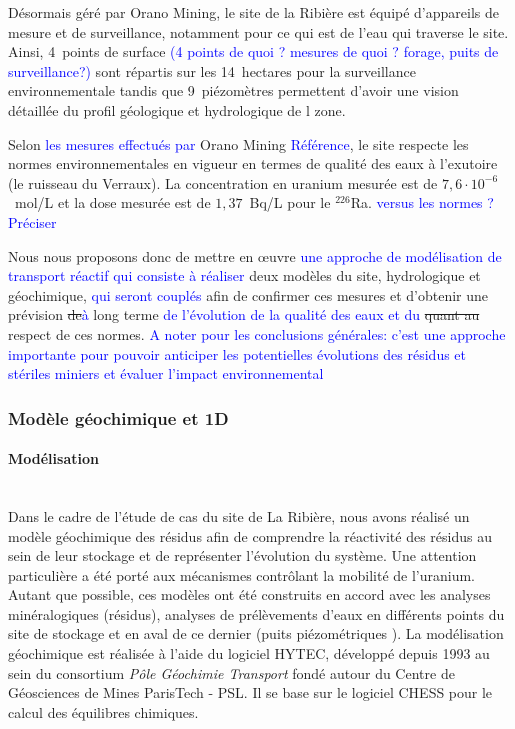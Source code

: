 \documentclass{article}
\newcommand{\blue}[1]{\textcolor{blue}{#1}} %
\begin{document}
Désormais géré par Orano Mining, le site de la Ribière est équipé d'appareils de mesure et de surveillance, notamment pour ce qui est de l’eau qui traverse le site. Ainsi, 4~points de surface \blue{(4 points de quoi ? mesures de quoi ? forage, puits de surveillance?)} sont répartis sur les 14~hectares pour la surveillance environnementale tandis que 9~piézomètres permettent d’avoir une vision détaillée du profil géologique et hydrologique de l zone.

Selon \blue{les mesures effectués par} Orano Mining \blue{Référence}, le site respecte les normes environnementales en vigueur en termes de qualité des eaux à l’exutoire (le ruisseau du Verraux). La concentration en uranium mesurée est de $7,6 \cdot 10^{-6}$~mol/L et la dose mesurée est de $1,37$~Bq/L pour le $^{226}$Ra. \blue{versus les normes ? Préciser} %

Nous nous proposons donc de mettre en œuvre \blue{une approche de modélisation de transport réactif qui consiste à réaliser} deux modèles du site, hydrologique et géochimique, \blue{qui seront couplés}  afin de confirmer ces mesures et d’obtenir une prévision \sout{de}\blue{à} long terme \blue{de l'évolution de la qualité des eaux et du} \sout{quant au} respect de ces normes. \blue{A noter pour les conclusions générales: c'est une approche importante pour pouvoir anticiper les potentielles évolutions des résidus et stériles miniers et évaluer l'impact environnemental}

\subsubsection{Modèle géochimique et 1D} \label{subsec:geoch_1D}

\paragraph{Modélisation \\ \\}
Dans le cadre de l’étude de cas du site de La Ribière, nous avons réalisé un modèle géochimique des résidus afin de comprendre la réactivité des résidus au sein de leur stockage et de représenter l'évolution du système. Une attention particulière a été porté aux mécanismes contrôlant la mobilité de l'uranium. Autant que possible, ces modèles ont été construits en accord avec les analyses minéralogiques (résidus), analyses de prélèvements d'eaux en différents points du site de stockage et en aval de ce dernier (puits piézométriques \cite{societe_areva_nc_etude_2010}). La modélisation géochimique est réalisée à l'aide du logiciel HYTEC, développé depuis 1993 au sein du consortium \emph{Pôle Géochimie Transport} fondé autour du Centre de Géosciences de Mines ParisTech - PSL. Il se base sur le logiciel CHESS \cite{lagneau:hal-00614306} pour le calcul des équilibres chimiques.
\end{document}
